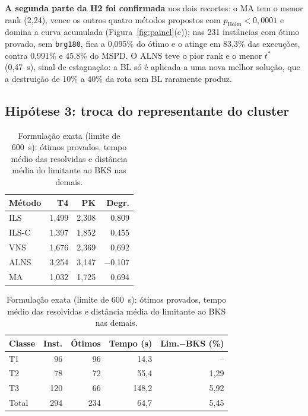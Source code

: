 \textbf{A segunda parte da H2 foi confirmada} nos dois recortes: o MA tem o menor rank (2,24), vence os outros quatro métodos propostos com $p_{\mathrm{Holm}}<0{,}0001$ e domina a curva acumulada (Figura~\ref{fig:painel}(c)); nas 231 instâncias com ótimo provado, sem \texttt{brg180}, fica a 0,095\% do ótimo e o atinge em 83,3\% das execuções, contra 0,991\% e 45,8\% do MSPD. O ALNS teve o pior rank e o menor $t^*$ (0,47~s), sinal de estagnação: a BL só é aplicada a uma nova melhor solução, que a destruição de 10\% a 40\% da rota sem BL raramente produz.

\subsection{Hipótese 3: troca do representante do cluster}

\begin{table}[t]
\centering
\footnotesize
\setlength{\tabcolsep}{4pt}
\begin{minipage}[t]{0.42\textwidth}\centering
\caption{H3: gap médio ao BKS (\%) em T4 e PK e degradação (p.p.).}
\label{tab:h3}
\begin{tabular}{lrrr}
\toprule
Método & T4 & PK & Degr. \\
\midrule
ILS & 1,499 & 2,308 & 0,809 \\
ILS-C & 1,397 & 1,852 & 0,455 \\
VNS & 1,676 & 2,369 & 0,692 \\
ALNS & 3,254 & 3,147 & $-$0,107 \\
MA & 1,032 & 1,725 & 0,694 \\
\bottomrule
\end{tabular}
\end{minipage}\hfill
\begin{minipage}[t]{0.55\textwidth}\centering
\caption{Formulação exata (limite de 600~s): ótimos provados, tempo médio das resolvidas e distância média do limitante ao BKS nas demais.}
\label{tab:exato}
\begin{tabular}{lrrrr}
\toprule
Classe & Inst. & Ótimos & Tempo (s) & Lim.$-$BKS (\%) \\
\midrule
T1 & 96 & 96 & 14,3 & -- \\
T2 & 78 & 72 & 55,4 & 1,29 \\
T3 & 120 & 66 & 148,2 & 5,92 \\
\midrule
Total & 294 & 234 & 64,7 & 5,45 \\
\bottomrule
\end{tabular}
\end{minipage}
\end{table}

